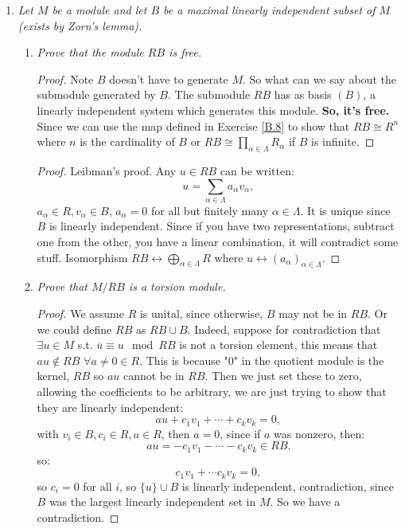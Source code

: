\documentclass[9pt,reqno,twoside]{amsbook}
\theoremstyle{plain}
\numberwithin{section}{chapter}
\numberwithin{equation}{chapter}
\theoremstyle{definition}
\theoremstyle{remark}
\theoremstyle{plain}
\begin{document}
\begin{enumerate}[label=\arabic*.]
\item \textit{Let $M$ be a module and let $B$ be a maximal linearly independent subset of $M$ (exists by Zorn's lemma). }

\begin{enumerate}
\item \textit{Prove that the module $RB$ is free. }

\begin{proof}
Note $B$ doesn't have to generate $M$. So what can we say about the submodule generated by $B$. The submodule $RB$ has as basis $(B)$, a linearly independent system which generates this module. \textbf{So, it's free.} Since we can use the map defined in Exercise \ref{B.8} to show that $RB \cong R^n$ where $n$ is the cardinality of $B$ or $RB \cong \prod_{\alpha \in \Lambda} R_\alpha$ if $B$ is infinite. 
\end{proof}

\begin{proof}
Leibman's proof. Any $u \in RB$ can be written:
$$
u = \sum_{\alpha \in \Lambda} a_\alpha v_\alpha,
$$
$a_\alpha \in R,v_\alpha \in B$, $a_\alpha = 0$ for all but finitely many $\alpha \in \Lambda$. It is unique since $B$ is linearly independent. Since if you have two representations, subtract one from the other, you have a linear combination, it will contradict some stuff. Isomorphism $RB \leftrightarrow \bigoplus_{\alpha \in \Lambda} R$ where $u \leftrightarrow (a_\alpha)_{\alpha \in \Lambda}$. 
\end{proof}

\item \textit{Prove that $M/RB$ is a torsion module. }

\begin{proof}
We assume $R$ is unital, since otherwise, $B$ may not be in $RB$. Or we could define $RB$ as $RB \cup B$. 
Indeed, suppose for contradiction that $\exists u \in M$ s.t. $\overline{u} \equiv u \mod RB$ is not a torsion element, this means that $au \notin RB$ $\forall a \neq 0 \in R$. This is because "0" in the quotient module is the kernel, $RB$ so $au$ cannot be in $RB$. Then we just set these to zero, allowing the coefficients to be arbitrary, we are just trying to show that they are linearly independent:
$$
au + c_1v_1 + \cdots + c_kv_k = 0,
$$
 with $v_i \in B, c_i \in R, a \in R$, then $a = 0$, since if $a$ was nonzero, then:
 $$
 au = -c_1v_1 - \cdots - c_kv_k \in RB.
 $$ 
 so:
 $$
 c_1v_1 + \cdots c_kv_k = 0,
 $$
 so $c_i = 0$ for all $i$, so $\{u\}\cup B$ is linearly independent, contradiction, since $B$ was the largest linearly independent set in $M$. So we have a contradiction. 
 

\end{proof}
\end{enumerate}
\end{enumerate}
\end{document}
